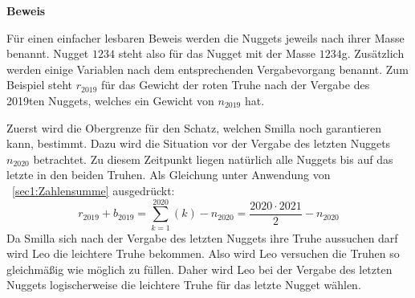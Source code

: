 \documentclass[10pt, a4paper, reqno]{amsart}
\makeatletter
\renewcommand\proofname{Beweis}
\renewenvironment{proof}[1][\proofname]{\par
\pushQED{\qed}%
\normalfont \topsep6\p@\@plus6\p@\relax
\trivlist
\item\relax
{\bfseries#1}\hspace\labelsep\ignorespaces
}{%
\popQED\endtrivlist\@endpefalse
}
\makeatother
\begin{document}
\begin{proof}
  Für einen einfacher lesbaren Beweis werden die Nuggets jeweils nach ihrer
  Masse benannt. Nugget $1234$ steht also für das Nugget mit der Masse $1234$g.
  Zusätzlich werden einige Variablen nach dem entsprechenden Vergabevorgang benannt.
  Zum Beispiel steht $r_{2019}$ für das Gewicht der roten Truhe nach der Vergabe
  des 2019ten Nuggets, welches ein Gewicht von $n_{2019}$ hat.
  
  Zuerst wird die Obergrenze für den Schatz, welchen Smilla noch garantieren
  kann, bestimmt. Dazu wird die Situation vor der Vergabe des letzten Nuggets
  $n_{2020}$ betrachtet. Zu diesem Zeitpunkt liegen natürlich alle Nuggets bis
  auf das letzte in den beiden Truhen. Als Gleichung unter Anwendung
  von ~\autoref{sec1:Zahlensumme} ausgedrückt:
  \begin{equation}\label{sec1:equation1}
    r_{2019}+b_{2019}=\sum_{k=1}^{2020}\left(k\right)-n_{2020}=\frac{2020\cdot2021}{2}-n_{2020}
  \end{equation}
  Da Smilla sich nach der Vergabe des letzten Nuggets ihre Truhe aussuchen darf
  wird Leo die leichtere Truhe bekommen. Also wird Leo versuchen die Truhen so
  gleichmäßig wie möglich zu füllen. Daher wird Leo bei der Vergabe des letzten
  Nuggets logischerweise die leichtere Truhe für das letzte Nugget wählen.


\end{proof}
\end{document}
